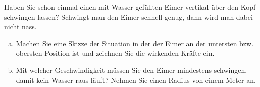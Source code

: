 
\begin{aufgabe}
	
Haben Sie schon einmal einen mit Wasser gefüllten Eimer vertikal über den Kopf schwingen lassen?
Schwingt man den Eimer schnell genug, dann wird man dabei nicht nass.
\begin{enumerate} [a)]
	\item Machen Sie eine Skizze der Situation in der der Eimer an der untersten bzw.~ obersten Position ist
und zeichnen Sie die wirkenden Kräfte ein.
\item Mit welcher Geschwindigkeit müssen Sie den Eimer mindestens schwingen, damit kein Wasser raus läuft? 
	Nehmen Sie einen Radius von einem Meter an.
\end{enumerate}
\end{aufgabe}
